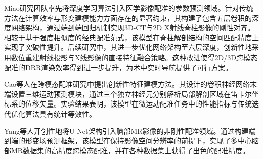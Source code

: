 




Miao研究团队率先将深度学习算法引入医学影像配准的参数预测领域。针对传统方法在计算效率与形变建模能力方面存在的显著约束，其构建了包含五层卷积的深度网络架构，通过端到端回归机制实现3D-CT与2D X射线脊柱影像的刚性对齐。相较于基于强度相似度的经典配准范式，该模型在脊柱解剖结构的空间匹配精度上实现了突破性提升\cite{miao2016cnn}。后续研究中，其进一步优化网络架构至六层深度，创新性地采用数位重建射线投影与X线影像的直接特征融合策略。这种改进使得2D/3D跨模态配准的DRR渲染效率得到进一步提升，为术中实时导航提供了可行方案\cite{miao2016real}。

Cao等人在跨模态配准研究中提出创新性特征建模方法。其设计的卷积神经网络末端设置三维运动预测模块，通过三个独立神经元分别解析局部解剖区域在笛卡尔坐标系的位移矢量。实验结果表明，该模型在微运动配准任务中的性能指标与传统迭代优化算法具有统计等效性\cite{cao2018deep}。

Yang等人开创性地将U-Net架构引入脑部MR影像的非刚性配准领域。通过构建端到端的形变场预测框架，该模型在保持影像空间分辨率的前提下，实现了多中心脑部MR数据集的高精度跨模态配准，并在各种数据集上获得了出色的配准精度\cite{yang2017quicksilver}。

